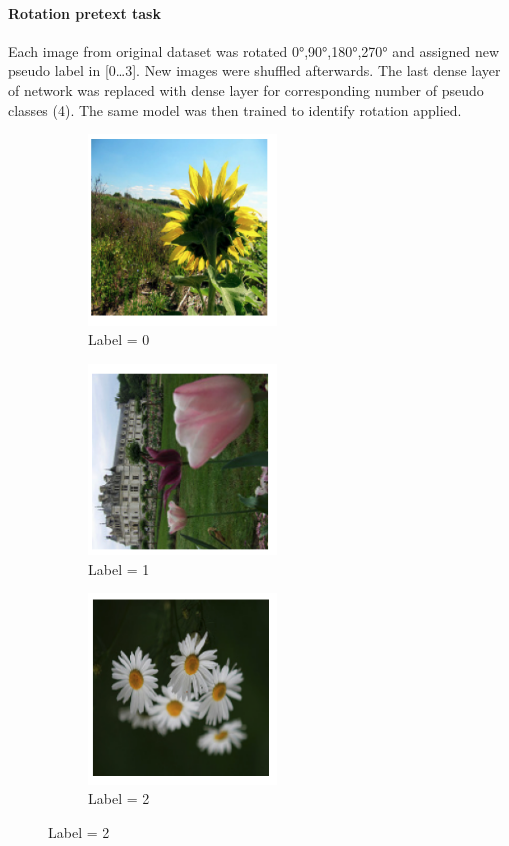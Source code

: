 \paragraph{Rotation pretext task}
Each image from original dataset was rotated 0°,90°,180°,270° and assigned new pseudo label in [0\ldots3].
New images were shuffled afterwards.
The last dense layer of network was replaced with dense layer for corresponding number of pseudo classes (4).
The same model was then trained to identify rotation applied.
\\
\begin{figure}[!htp]
    \begin{subfigure}{0.33\textwidth}
        \caption{Label = 0}
        \includegraphics[width=5cm]{images/rot_0}
    \end{subfigure}
    \begin{subfigure}{0.2\textwidth}
        \caption{Label = 1}
        \includegraphics[width=5cm]{images/rot_1}
    \end{subfigure}
    \begin{subfigure}{0.33\textwidth}
        \caption{Label = 2}
        \includegraphics[width=5cm]{images/rot_2}
    \end{subfigure}
\end{figure}

